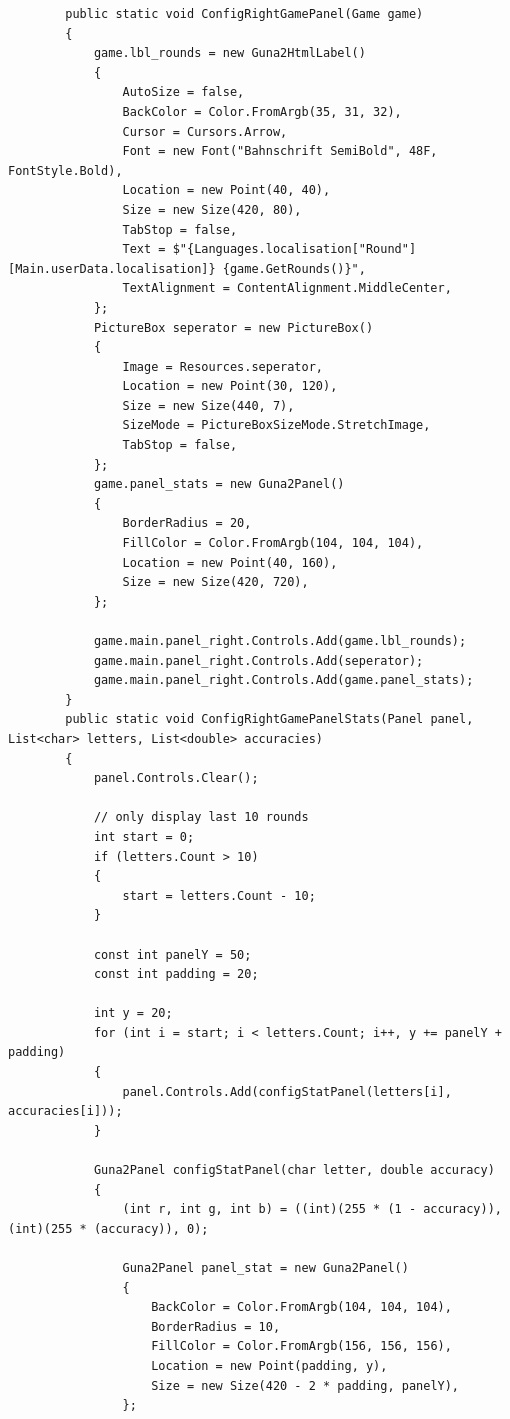 \documentclass{article}
\begin{document}
\begin{verbatim}
		public static void ConfigRightGamePanel(Game game)
		{
			game.lbl_rounds = new Guna2HtmlLabel()
			{
				AutoSize = false,
				BackColor = Color.FromArgb(35, 31, 32),
				Cursor = Cursors.Arrow,
				Font = new Font("Bahnschrift SemiBold", 48F, FontStyle.Bold),
				Location = new Point(40, 40),
				Size = new Size(420, 80),
				TabStop = false,
				Text = $"{Languages.localisation["Round"][Main.userData.localisation]} {game.GetRounds()}",
				TextAlignment = ContentAlignment.MiddleCenter,
			};
			PictureBox seperator = new PictureBox()
			{
				Image = Resources.seperator,
				Location = new Point(30, 120),
				Size = new Size(440, 7),
				SizeMode = PictureBoxSizeMode.StretchImage,
				TabStop = false,
			};
			game.panel_stats = new Guna2Panel()
			{
				BorderRadius = 20,
				FillColor = Color.FromArgb(104, 104, 104),
				Location = new Point(40, 160),
				Size = new Size(420, 720),
			};

			game.main.panel_right.Controls.Add(game.lbl_rounds);
			game.main.panel_right.Controls.Add(seperator);
			game.main.panel_right.Controls.Add(game.panel_stats);
		}
		public static void ConfigRightGamePanelStats(Panel panel, List<char> letters, List<double> accuracies)
		{
			panel.Controls.Clear();

			// only display last 10 rounds
			int start = 0;
			if (letters.Count > 10)
			{
				start = letters.Count - 10;
			}

			const int panelY = 50;
			const int padding = 20;

			int y = 20;
			for (int i = start; i < letters.Count; i++, y += panelY + padding)
			{
				panel.Controls.Add(configStatPanel(letters[i], accuracies[i]));
			}

			Guna2Panel configStatPanel(char letter, double accuracy)
			{
				(int r, int g, int b) = ((int)(255 * (1 - accuracy)), (int)(255 * (accuracy)), 0);

				Guna2Panel panel_stat = new Guna2Panel()
				{
					BackColor = Color.FromArgb(104, 104, 104),
					BorderRadius = 10,
					FillColor = Color.FromArgb(156, 156, 156),
					Location = new Point(padding, y),
					Size = new Size(420 - 2 * padding, panelY),
				};


\end{verbatim}
\end{document}

